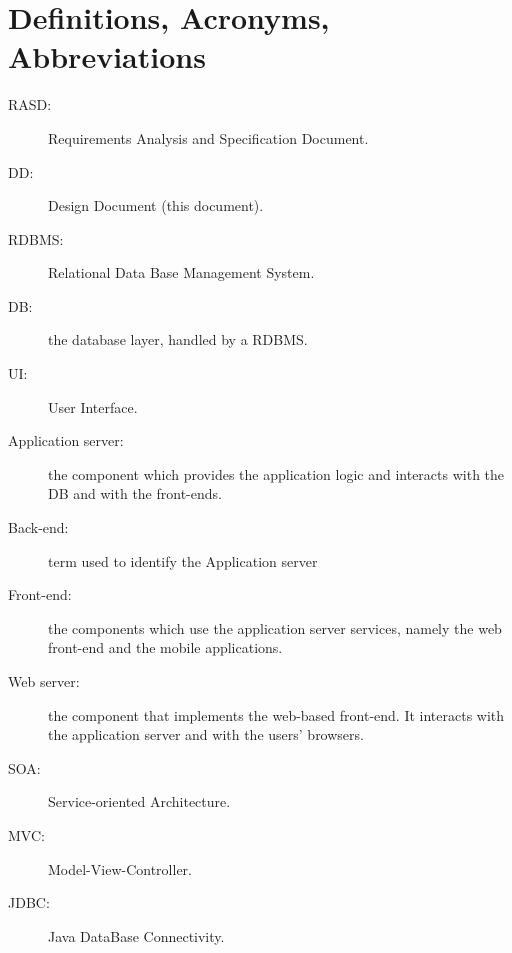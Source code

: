 \section{Definitions, Acronyms, Abbreviations}
\label{sec:definitions}

\begin{description}
\item[RASD:] Requirements Analysis and Specification Document.
\item[DD:] Design Document (this document).
\item[RDBMS:] Relational Data Base Management System.
\item[DB:] the database layer, handled by a RDBMS.
\item[UI:] User Interface.
\item[Application server:] the component which provides the application logic and interacts with the DB and with the front-ends.
\item[Back-end:] term used to identify the Application server
\item[Front-end:] the components which use the application server services, namely the web front-end and the mobile applications.
\item[Web server:] the component that implements the web-based front-end. It interacts with the application server and with the users' browsers.
\item[SOA:] Service-oriented Architecture.
\item[MVC:] Model-View-Controller.
\item[JDBC:] Java DataBase Connectivity.
\end{description}

